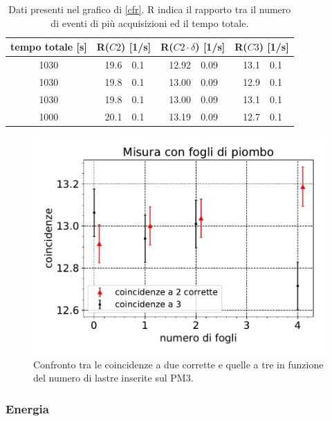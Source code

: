 \begin{table}[h]
\centering
\begin{tabular}{| c | r @{$\pm$} l | r @{$\pm$} l | r @{$\pm$} l |}
\hline
tempo totale [\si{s}] & \multicolumn{2}{c|}{R($C2$) [1/\si{s}]} & \multicolumn{2}{c|}{R($C2\cdot \delta$) [1/\si{s}]} & \multicolumn{2}{c|}{R($C3$) [1/\si{s}]} \\
\hline
1030 & 19.6&0.1 & 12.92&0.09 & 13.1&0.1 \\
1030 & 19.8&0.1 & 13.00&0.09 & 12.9&0.1 \\
1030 & 19.8&0.1 & 13.00&0.09 & 13.1&0.1 \\
1000 & 20.1&0.1 & 13.19&0.09 & 12.7&0.1 \\
\hline
\end{tabular}
\caption{Dati presenti nel grafico di \autoref{cfr}. R indica il rapporto tra il numero di eventi di più acquisizioni ed il tempo totale.}
\label{dati cfr}
\end{table}


\begin{figure}[h]
\centering
\includegraphics[width=8 cm]{confronto}
\caption{Confronto tra le coincidenze a due corrette e quelle a tre in funzione del numero di lastre inserite sul PM3.}
\label{cfr}
\end{figure}

\subsubsection{Energia}

